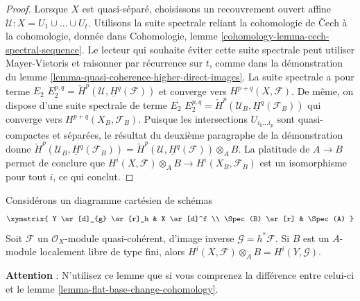 \begin{proof}
\medskip\noindent
Lorsque $X$ est quasi-séparé, choisissons un recouvrement ouvert affine
$\mathcal{U} : X = U_1 \cup \ldots \cup U_t$. Utilisons la suite spectrale reliant la cohomologie de
{\v C}ech à la cohomologie, donnée
dans Cohomologie, lemme \ref{cohomology-lemma-cech-spectral-sequence}.
Le lecteur qui souhaite éviter cette suite spectrale peut utiliser
Mayer-Vietoris et raisonner par récurrence sur $t$, comme dans la démonstration du
lemme \ref{lemma-quasi-coherence-higher-direct-images}.
La suite spectrale a pour terme $E_2$
$E_2^{p, q} = \check{H}^p(\mathcal{U}, \underline{H}^q(\mathcal{F}))$
et converge vers $H^{p + q}(X, \mathcal{F})$.
De même, on dispose d'une suite spectrale de terme $E_2$
$E_2^{p, q} = \check{H}^p(\mathcal{U}_B, \underline{H}^q(\mathcal{F}_B))$
qui converge vers $H^{p + q}(X_B, \mathcal{F}_B)$.
Puisque les intersections $U_{i_0 \ldots i_p}$ sont quasi-compactes
et séparées, le résultat du deuxième paragraphe de la démonstration donne
$\check{H}^p(\mathcal{U}_B, \underline{H}^q(\mathcal{F}_B)) =
\check{H}^p(\mathcal{U}, \underline{H}^q(\mathcal{F})) \otimes_A B$.
La platitude de $A \to B$ permet de conclure que
$H^i(X, \mathcal{F}) \otimes_A B \to H^i(X_B, \mathcal{F}_B)$
est un isomorphisme pour tout $i$, ce qui conclut.
\end{proof}

\begin{lemma}
\label{lemma-finite-locally-free-base-change-cohomology}
Considérons un diagramme cartésien de schémas
$$
\xymatrix{
Y \ar[d]_{g} \ar[r]_h & X \ar[d]^f \\
\Spec(B) \ar[r] & \Spec(A)
}
$$
Soit $\mathcal{F}$ un $\mathcal{O}_X$-module
quasi-cohérent, d'image inverse $\mathcal{G} = h^*\mathcal{F}$.
Si $B$ est un $A$-module localement libre de type fini, alors
$H^i(X, \mathcal{F}) \otimes_A B = H^i(Y, \mathcal{G})$.
\end{lemma}

\noindent
{\bf Attention} : N'utilisez ce lemme que si vous comprenez la différence entre
celui-ci et le lemme \ref{lemma-flat-base-change-cohomology}.

